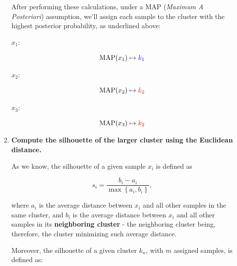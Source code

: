 \documentclass[12pt]{article}
\begin{document}
\begin{enumerate}[leftmargin=\labelsep]
\begin{enumerate}[leftmargin=\labelsep]
\begin{paracol}{3}
                \end{paracol}

                After performing these calculations, under a MAP (\emph{Maximum A Posteriori})
                assumption, we'll assign each sample to the cluster with the highest posterior
                probability, as underlined above:

                \begin{paracol}{3}
                  \setlength{\columnseprule}{1pt}
                  \def\columnseprulecolor{\color{black}}
                  \centering

                  $x_1$:

                  $$
                    \text{MAP}(x_1) \mapsto \textcolor{blue}{k_1}
                  $$

                  \switchcolumn

                  $x_2$:

                  $$
                    \text{MAP}(x_2) \mapsto \textcolor{red}{k_2}
                  $$

                  \switchcolumn

                  $x_3$:

                  $$
                    \text{MAP}(x_3) \mapsto \textcolor{red}{k_2}
                  $$

                \end{paracol}

                \pagebreak

          \item \textbf{Compute the silhouette of the larger cluster using the Euclidean distance.}

                As we know, the silhouette of a given sample $x_i$ is defined as

                \begin{equation*}
                  s_i = \frac{b_i - a_i}{\max\left\{a_i, b_i\right\}},
                \end{equation*}

                where $a_i$ is the average distance between $x_i$ and all other samples
                in the same cluster, and $b_i$ is the average distance between $x_i$ and all
                other samples in its \textbf{neighboring cluster} - the neighboring
                cluster being, therefore, the cluster minimizing such average distance.

                Moreover, the silhouette of a given cluster $k_n$, with $m$ assigned samples,
                is defined as:


\end{enumerate}
\end{enumerate}
\end{document}
